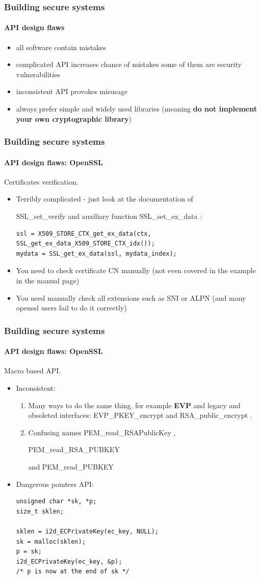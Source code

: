 \documentclass[11pt,t]{beamer}
\newcommand{\funcname}[1]{
	{\color{yellow!30} #1}
}
\begin{document}
\begin{frame}
\frametitle{Building secure systems}
\framesubtitle{API design flaws}
\begin{itemize}
\item<1-> all software contain mistakes
\item<2-> complicated API increases chance of mistakes some of them are security 
vulnerabilities
\item<3-> inconsistent API provokes misusage
\item<4-> always prefer simple and widely used libraries (meaning \textbf{do not 
implement your own cryptographic library})
\end{itemize}
\end{frame}

\begin{frame}[fragile]
\frametitle{Building secure systems}
\framesubtitle{API design flaws: OpenSSL}
Certificates verification.
\begin{itemize}
\item Terribly complicated - just look at the documentation of 
\funcname{SSL\_set\_verify} and auxiliary function \funcname{SSL\_set\_ex\_data}:
\begin{tiny}
\begin{verbatim}
ssl = X509_STORE_CTX_get_ex_data(ctx, SSL_get_ex_data_X509_STORE_CTX_idx());
mydata = SSL_get_ex_data(ssl, mydata_index);
\end{verbatim}
\end{tiny}
\item You need to check certificate CN manually (not even covered in the example in 
the manual page)
\item You need manually check all extensions such as SNI or ALPN (and many openssl users 
fail to do it correctly)
\end{itemize}
\end{frame}

\begin{frame}[fragile]
\frametitle{Building secure systems}
\framesubtitle{API design flaws: OpenSSL}
Macro based API.
\begin{itemize}
\item Inconsistent: 
\begin{enumerate}
\item Many ways to do the same thing, for example \textbf{EVP} and legacy and obsoleted 
interfaces: \funcname{EVP\_PKEY\_encrypt} and \funcname{RSA\_public\_encrypt}.
\item Confusing names \funcname{PEM\_read\_RSAPublicKey}, 
\funcname{PEM\_read\_RSA\_PUBKEY} 
and \funcname{PEM\_read\_PUBKEY}
\end{enumerate}
\item Dangerous pointers API:
\begin{tiny}
\begin{verbatim}
unsigned char *sk, *p;
size_t sklen;

sklen = i2d_ECPrivateKey(ec_key, NULL);
sk = malloc(sklen);
p = sk;
i2d_ECPrivateKey(ec_key, &p);
/* p is now at the end of sk */
\end{verbatim}
\end{tiny}
\end{itemize}
\end{frame}
\end{document}
